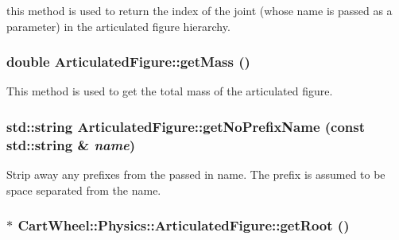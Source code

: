 \label{classCartWheel_1_1Physics_1_1ArticulatedFigure_a4096aa039849960ae74a0ff601947950}
this method is used to return the index of the joint (whose name is passed as a parameter) in the articulated figure hierarchy. \hypertarget{classCartWheel_1_1Physics_1_1ArticulatedFigure_a50d82cbfe82ff6d72a0154f629390570}{
\subsubsection[{getMass}]{\setlength{\rightskip}{0pt plus 5cm}double ArticulatedFigure::getMass ()}}
\label{classCartWheel_1_1Physics_1_1ArticulatedFigure_a50d82cbfe82ff6d72a0154f629390570}
This method is used to get the total mass of the articulated figure. \hypertarget{classCartWheel_1_1Physics_1_1ArticulatedFigure_a7ea2a7587961f136ba0151dc029bd606}{
\subsubsection[{getNoPrefixName}]{\setlength{\rightskip}{0pt plus 5cm}std::string ArticulatedFigure::getNoPrefixName (const std::string \& {\em name})}}
\label{classCartWheel_1_1Physics_1_1ArticulatedFigure_a7ea2a7587961f136ba0151dc029bd606}
Strip away any prefixes from the passed in name. The prefix is assumed to be space separated from the name. \hypertarget{classCartWheel_1_1Physics_1_1ArticulatedFigure_aee890ecb5f6b455e02b9a6632b76ef17}{
\subsubsection[{getRoot}]{$\ast$ CartWheel::Physics::ArticulatedFigure::getRoot ()}}
\label{classCartWheel_1_1Physics_1_1ArticulatedFigure_aee890ecb5f6b455e02b9a6632b76ef17}
